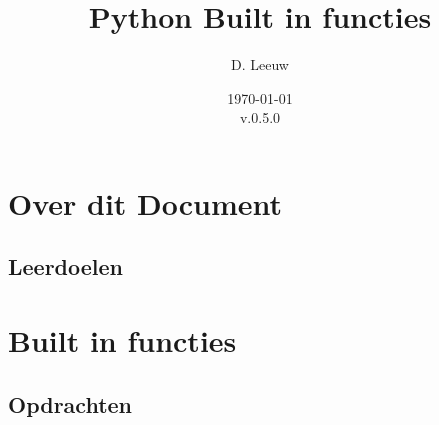 \documentclass[a4paper,12pt,twoside,openright,titlepage]{article}
\author{D. Leeuw}
\title{Python Built in functies}
\date{\today\\v.0.5.0}
\date{\today\\
0.5.0\\
\vfill
\raggedright
\copyright\ 2025 Dennis Leeuw\\
}
\begin{document}

\maketitle


\section{Over dit Document}
\subsection{Leerdoelen}



\section{Built in functies}

%
\subsection{Opdrachten}


\printindex
\end{document}
